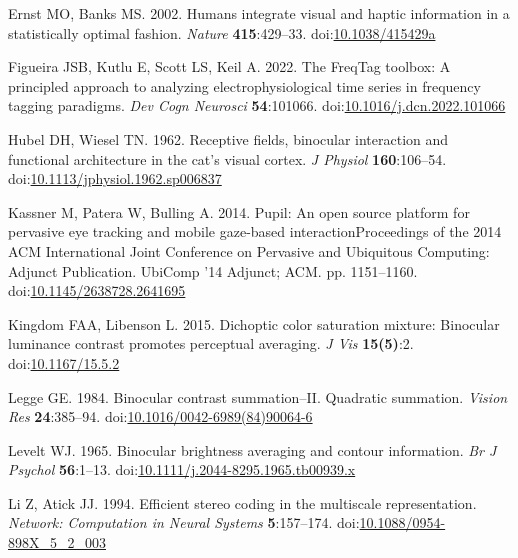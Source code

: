 \documentclass[
]{article}
\newlength{\cslhangindent}
\newlength{\cslentryspacingunit} %
\newenvironment{CSLReferences}[2] %
 {%
  \setlength{\parindent}{0pt}
  \ifodd #1
  \let\oldpar\par
  \def\par{\hangindent=\cslhangindent\oldpar}
  \fi
  \setlength{\parskip}{#2\cslentryspacingunit}
 }%
 {}
\begin{document}
\begin{CSLReferences}{1}{0}
\leavevmode{}%
Ernst MO, Banks MS. 2002. Humans integrate visual and haptic information in a statistically optimal fashion. \emph{Nature} \textbf{415}:429--33. doi:\href{https://doi.org/10.1038/415429a}{10.1038/415429a}

\leavevmode{}%
Figueira JSB, Kutlu E, Scott LS, Keil A. 2022. The FreqTag toolbox: A principled approach to analyzing electrophysiological time series in frequency tagging paradigms. \emph{Dev Cogn Neurosci} \textbf{54}:101066. doi:\href{https://doi.org/10.1016/j.dcn.2022.101066}{10.1016/j.dcn.2022.101066}

\leavevmode{}%
Hubel DH, Wiesel TN. 1962. Receptive fields, binocular interaction and functional architecture in the cat's visual cortex. \emph{J Physiol} \textbf{160}:106--54. doi:\href{https://doi.org/10.1113/jphysiol.1962.sp006837}{10.1113/jphysiol.1962.sp006837}

\leavevmode{}%
Kassner M, Patera W, Bulling A. 2014. Pupil: An open source platform for pervasive eye tracking and mobile gaze-based interactionProceedings of the 2014 {ACM} International Joint Conference on Pervasive and Ubiquitous Computing: Adjunct Publication. UbiComp '14 Adjunct; {ACM}. pp. 1151--1160. doi:\href{https://doi.org/10.1145/2638728.2641695}{10.1145/2638728.2641695}

\leavevmode{}%
Kingdom FAA, Libenson L. 2015. Dichoptic color saturation mixture: Binocular luminance contrast promotes perceptual averaging. \emph{J Vis} \textbf{15(5)}:2. doi:\href{https://doi.org/10.1167/15.5.2}{10.1167/15.5.2}

\leavevmode{}%
Legge GE. 1984. Binocular contrast summation--II. Quadratic summation. \emph{Vision Res} \textbf{24}:385--94. doi:\href{https://doi.org/10.1016/0042-6989(84)90064-6}{10.1016/0042-6989(84)90064-6}

\leavevmode{}%
Levelt WJ. 1965. Binocular brightness averaging and contour information. \emph{Br J Psychol} \textbf{56}:1--13. doi:\href{https://doi.org/10.1111/j.2044-8295.1965.tb00939.x}{10.1111/j.2044-8295.1965.tb00939.x}

\leavevmode{}%
Li Z, Atick JJ. 1994. Efficient stereo coding in the multiscale representation. \emph{Network: Computation in Neural Systems} \textbf{5}:157--174. doi:\href{https://doi.org/10.1088/0954-898X_5_2_003}{10.1088/0954-898X\_5\_2\_003}


\end{CSLReferences}
\end{document}
